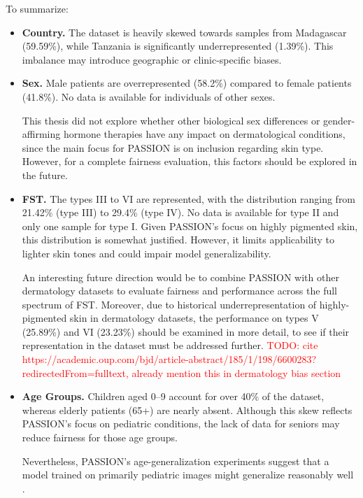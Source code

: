 \documentclass[12pt, a4paper, oneside]{book}   	%
\renewcommand{\todo}[1]{\textcolor{red}{TODO: #1}}
\begin{document}
		To summarize:
		
		\begin{itemize}
			\item \textbf{Country.} The dataset is heavily skewed towards samples from Madagascar (59.59\%), while Tanzania is significantly underrepresented (1.39\%). This imbalance may introduce geographic or clinic-specific biases.
			
			\item \textbf{Sex.} Male patients are overrepresented (58.2\%) compared to female patients (41.8\%). No data is available for individuals of other sexes.
			
			This thesis did not explore whether other biological sex differences or gender-affirming hormone therapies have any impact on dermatological conditions, since the main focus for PASSION is on inclusion regarding skin type. However, for a complete fairness evaluation, this factors should be explored in the future.
			
			\item \textbf{\gls{FST}.} The types III to VI are represented, with the distribution ranging from 21.42\% (type III) to 29.4\% (type IV). No data is available for type II and only one sample for type I.  Given PASSION's focus on highly pigmented skin, this distribution is somewhat justified. However, it limits applicability to lighter skin tones and could impair model generalizability. 
			
			An interesting future direction would be to combine PASSION with other dermatology datasets to evaluate fairness and performance across the full spectrum of \gls{FST}. Moreover, due to historical underrepresentation of highly-pigmented skin in dermatology datasets, the performance on types V (25.89\%) and VI (23.23\%) should be examined in more detail, to see if their representation in the dataset must be addressed further.
			\todo{cite https://academic.oup.com/bjd/article-abstract/185/1/198/6600283?redirectedFrom=fulltext, already mention this in dermatology bias section}
			
			
			\item \textbf{Age Groups.} Children aged 0–9 account for over 40\% of the dataset, whereas elderly patients (65+) are nearly absent. Although this skew reflects PASSION’s focus on \gls{pediatric} conditions, the lack of data for seniors may reduce fairness for those age groups.
			
			Nevertheless, PASSION's age-generalization experiments suggest that a model trained on primarily \gls{pediatric} images might generalize reasonably well \autocite{Gottfrois2024}.
			

\end{itemize}
\end{document}
